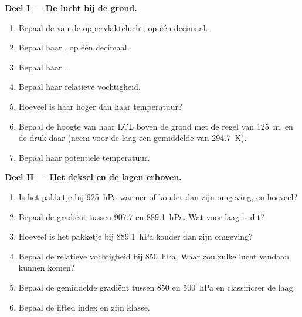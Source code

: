 \begin{problem}
\medskip\noindent\textbf{Deel I --- De lucht bij de grond.}
\begin{enumerate}
  \item Bepaal de  van de oppervlaktelucht, op één decimaal.
  \item Bepaal haar , op één decimaal.
  \item Bepaal haar .
  \item Bepaal haar relatieve vochtigheid.
  \item Hoeveel is haar  hoger dan haar temperatuur?
  \item Bepaal de hoogte van haar LCL boven de grond met de regel van \qty{125}{m}, en de druk
        daar (neem voor de laag een gemiddelde  van \qty{294.7}{K}).
  \item Bepaal haar potentiële temperatuur.
\end{enumerate}

\medskip\noindent\textbf{Deel II --- Het deksel en de lagen erboven.}
\begin{enumerate}[resume]
  \item Is het pakketje bij \qty{925}{hPa} warmer of kouder dan zijn omgeving, en hoeveel?
  \item Bepaal de gradiënt tussen 907.7 en \qty{889.1}{hPa}. Wat voor laag is dit?
  \item Hoeveel is het pakketje bij \qty{889.1}{hPa} kouder dan zijn omgeving?
  \item Bepaal de relatieve vochtigheid bij \qty{850}{hPa}. Waar zou zulke lucht vandaan kunnen komen?
  \item Bepaal de gemiddelde gradiënt tussen 850 en \qty{500}{hPa} en classificeer de laag.
  \item Bepaal de lifted index en zijn klasse.
\end{enumerate}


\end{problem}
